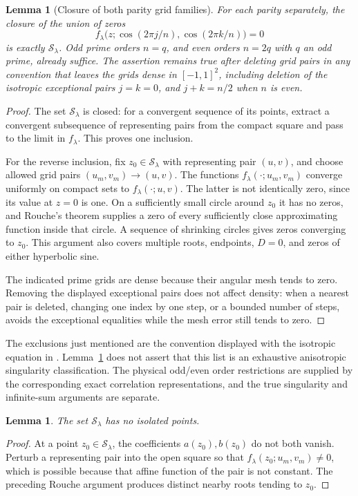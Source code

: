 \documentclass[11pt]{article}
\numberwithin{equation}{section}
\newtheorem{lemma}[theorem]{Lemma}
\theoremstyle{definition}
\newcommand{\cS}{\mathcal S}
\begin{document}
\begin{lemma}[Closure of both parity grid families]\label{lem:gridclosure}
For each parity separately, the closure of the union of zeros
\[
 f_\lambda\bigl(z;\cos(2\pi j/n),\cos(2\pi k/n)\bigr)=0
\]
is exactly \(\cS_\lambda\). Odd prime orders \(n=q\), and even orders
\(n=2q\) with \(q\) an odd prime, already suffice. The assertion remains
true after deleting grid pairs in any convention that leaves the grids
dense in \([-1,1]^2\), including deletion of the isotropic exceptional
pairs \(j=k=0\), and \(j+k=n/2\) when \(n\) is even.
\end{lemma}
\begin{proof}
The set \(\cS_\lambda\) is closed: for a convergent sequence of its
points, extract a convergent subsequence of representing pairs from the
compact square and pass to the limit in \(f_\lambda\).
This proves one inclusion.

For the reverse inclusion, fix \(z_0\in\cS_\lambda\) with representing
pair \((u,v)\), and choose allowed grid pairs \((u_m,v_m)\to(u,v)\).
The functions \(f_\lambda(\cdot;u_m,v_m)\) converge uniformly on compact
sets to \(f_\lambda(\cdot;u,v)\). The latter is not identically zero,
since its value at \(z=0\) is one. On a sufficiently small circle around
\(z_0\) it has no zeros, and Rouche's theorem supplies a zero of every
sufficiently close approximating function inside that circle. A sequence
of shrinking circles gives zeros converging to \(z_0\). This argument
also covers multiple roots, endpoints, \(D=0\), and zeros of either
hyperbolic sine.

The indicated prime grids are dense because their angular mesh tends
to zero. Removing the displayed exceptional pairs does not affect
density: when a nearest pair is deleted, changing one index by one
step, or a bounded number of steps, avoids the exceptional equalities
while the mesh error still tends to zero.
\end{proof}

The exclusions just mentioned are the convention displayed with the
isotropic equation in \cite[eq.~(52)]{BHM}. Lemma~\ref{lem:gridclosure}
does not assert that this list is an exhaustive anisotropic singularity
classification. The physical odd/even order restrictions are supplied
by the corresponding exact correlation representations, and the true
singularity and infinite-sum arguments are separate.

\begin{lemma}\label{lem:noisolatedS}
The set \(\cS_\lambda\) has no isolated points.
\end{lemma}
\begin{proof}
At a point \(z_0\in\cS_\lambda\), the coefficients \(a(z_0),b(z_0)\)
do not both vanish. Perturb a representing pair into the open square
so that \(f_\lambda(z_0;u_m,v_m)\ne0\), which is possible because that
affine function of the pair is not constant. The preceding Rouche
argument produces distinct nearby roots tending to \(z_0\).
\end{proof}
\end{document}
